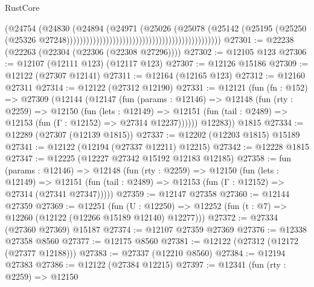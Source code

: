 \begin{lexlean}{RustCore}
\begin{coremodule}
                                                                              (@24754
                                                                                (@24830
                                                                                  (@24894
                                                                                    (@24971
                                                                                      (@25026
                                                                                        (@25078
                                                                                          (@25142
                                                                                            (@25195
                                                                                              (@25250
                                                                                                (@25326
                                                                                                  @27248)))))))))))))))))))))))))))))))))))))))))))))))
@27301 := @22238 (@22263 (@22304 (@22306 (@22308 @27296))))
@27302 := @12105 @123
@27306 := @12107 (@12111 @123) (@12117 @123)
@27307 := @12126 @15186
@27309 := @12122 (@27307 @12141)
@27311 := @12164 (@12165 @123)
@27312 := @12160 @27311
@27314 := @12122 (@27312 @12190)
@27331 := @12121
    (fun (fn : @152) =>
    @27309
      (@12144
        (@12147
          (fun (params : @12146) =>
          @12148
            (fun (rty : @2259) =>
            @12150
              (fun (lets : @12149) =>
              @12151 (fun (tail : @2489) => @12153 (fun (Γ : @12152) => @27314 @12237))))))
        @12283))
    @1815
@27334 := @12289 (@27307 (@12139 @1815))
@27337 := @12202 (@12203 @1815) @15189
@27341 := @12122 (@12194 (@27337 @12211) @12215)
@27342 := @12228 @1815
@27347 := @12225 (@12227 @27342 @15192 @12183 @12185)
@27358 := fun (params : @12146) =>
  @12148
    (fun (rty : @2259) =>
    @12150
      (fun (lets : @12149) =>
      @12151 (fun (tail : @2489) => @12153 (fun (Γ : @12152) => @27314 (@27341 @27347)))))
@27359 := @12147 @27358
@27360 := @12144 @27359
@27369 := @12251
    (fun (U : @12250) => @12252 (fun (t : @7) => @12260 (@12122 (@12266 @15189 @12140) @12277)))
@27372 := @27334 (@27360 @27369) @15187
@27374 := @12107 @27359 @27369
@27376 := @12338 @27358 @8560
@27377 := @12175 @8560
@27381 := @12122 (@27312 (@12172 (@27377 @12188)))
@27383 := @27337 (@12210 @8560)
@27384 := @12194 @27383
@27386 := @12122 (@27384 @12215)
@27397 := @12341
    (fun (rty : @2259) =>
    @12150

\end{coremodule}
\end{lexlean}
